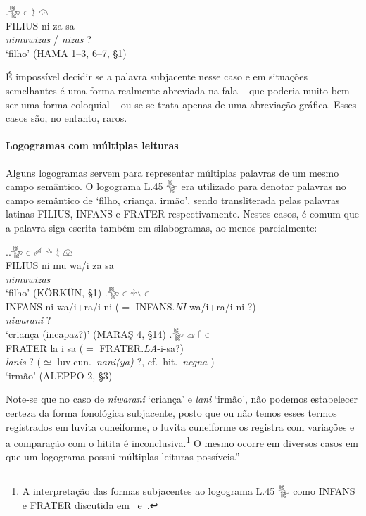 \exg.\Large 𔐰 \Large 𔗐 \Large 𔖪 \Large 𔗔\\
FILIUS ni za sa\\
\emph{nimuwizas} \slash{} \emph{nizas}{ }?\\
`filho' (HAMA 1–3, 6–7, §1)

É impossível decidir se a palavra subjacente nesse caso e em situações
semelhantes é uma forma realmente abreviada na fala  -- que poderia muito bem ser
uma forma coloquial -- ou se se trata apenas de uma abreviação gráfica.
Esses casos são, no entanto, raros.

\paragraph{Logogramas com múltiplas leituras}
Alguns logogramas servem para representar múltiplas palavras de um mesmo campo
semântico.
O logograma L.45 𔐰 era utilizado para denotar palavras no campo semântico de
`filho, criança, irmão', sendo transliterada pelas palavras latinas FILIUS,
INFANS e FRATER respectivamente. Nestes casos, é comum que a palavra siga
escrita também em silabogramas, ao menos parcialmente:

\ex.\ag.\Large 𔐰 \Large 𔗐 \Large 𔑿 \Large 𔗬 \Large 𔖪 \Large 𔗔\\
FILIUS ni mu wa\slash{}i za sa\\
\emph{nimuwizas} \\
`filho' (KÖRKÜN, §1)
\bg.\Large 𔐰 \Large 𔗐 \Large 𔗬𔖱 \Large 𔗐\\
INFANS ni wa\slash{}i+ra\slash{}i ni ($=$ INFANS.\emph{NI}-wa/i+ra/i-ni-?)\\
\emph{niwarani}{ }? \\
`criança (incapaz?)' (MARAŞ 4, §14)
\bg.\Large 𔐰 \Large 𔓊 \Large 𔓯 \Large 𔗐\\
FRATER la i sa ($=$ FRATER.\emph{LA}-i-sa?)\\
\emph{lanis}{ }?  ($\simeq$ luv.cun.\ \emph{nani{(ya)}-}?, cf.\ hit.\ \emph{negna-})\\
`irmão' (ALEPPO 2, §3)


\noindent Note-se que no caso de \emph{niwarani} `criança' e \emph{lani} `irmão',
não podemos estabelecer certeza da forma fonológica subjacente, posto que ou não
temos esses termos registrados em luvita cuneiforme, o luvita cuneiforme os
registra com variações e a comparação com o hitita
é inconclusiva.\footnote{A interpretação das formas subjacentes ao logograma
	L.45 𔐰 como INFANS e FRATER discutida em~\citet[143--6]{Hawkins1980}
	e~\citet[387]{Yakubovich2010b}.}
O mesmo ocorre em diversos casos em que um logograma possui múltiplas leituras
possíveis.''


